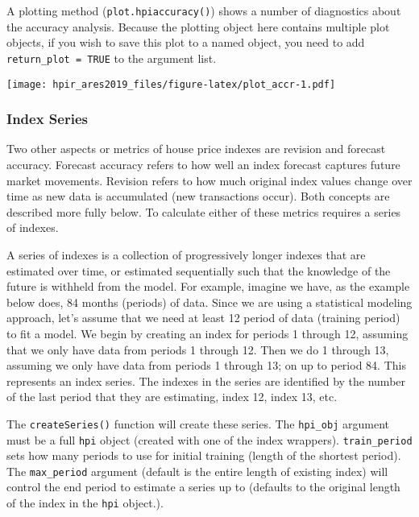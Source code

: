 \documentclass[]{article}
\newenvironment{Shaded}{\begin{snugshade}}{\end{snugshade}}
\newcommand{\KeywordTok}[1]{\textcolor[rgb]{0.13,0.29,0.53}{\textbf{#1}}}
\newcommand{\NormalTok}[1]{#1}
\newcommand{\OperatorTok}[1]{\textcolor[rgb]{0.81,0.36,0.00}{\textbf{#1}}}
\begin{document}
A plotting method (\texttt{plot.hpiaccuracy()}) shows a number of
diagnostics about the accuracy analysis. Because the plotting object
here contains multiple plot objects, if you wish to save this plot to a
named object, you need to add \texttt{return\_plot\ =\ TRUE} to the
argument list.

\begin{Shaded}
\end{Shaded}

\texttt{[image: hpir\_ares2019\_files/figure-latex/plot\_accr-1.pdf]}

\hypertarget{index-series}{%
\subsubsection{Index Series}\label{index-series}}

Two other aspects or metrics of house price indexes are revision and
forecast accuracy. Forecast accuracy refers to how well an index
forecast captures future market movements. Revision refers to how much
original index values change over time as new data is accumulated (new
transactions occur). Both concepts are described more fully below. To
calculate either of these metrics requires a series of indexes.

A series of indexes is a collection of progressively longer indexes that
are estimated over time, or estimated sequentially such that the
knowledge of the future is withheld from the model. For example, imagine
we have, as the example below does, 84 months (periods) of data. Since
we are using a statistical modeling approach, let's assume that we need
at least 12 period of data (training period) to fit a model. We begin by
creating an index for periods 1 through 12, assuming that we only have
data from periods 1 through 12. Then we do 1 through 13, assuming we
only have data from periods 1 through 13; on up to period 84. This
represents an index series. The indexes in the series are identified by
the number of the last period that they are estimating, index 12, index
13, etc.

The \texttt{createSeries()} function will create these series. The
\texttt{hpi\_obj} argument must be a full \texttt{hpi} object (created
with one of the index wrappers). \texttt{train\_period} sets how many
periods to use for initial training (length of the shortest period). The
\texttt{max\_period} argument (default is the entire length of existing
index) will control the end period to estimate a series up to (defaults
to the original length of the index in the \texttt{hpi} object.).
\end{document}
